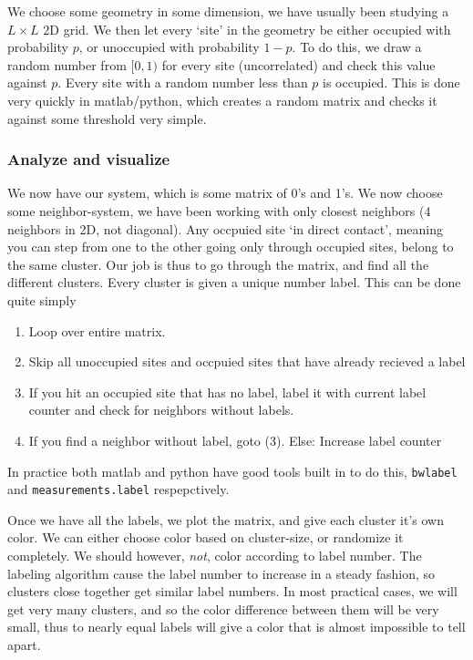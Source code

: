 \documentclass[a4paper, 11pt, notitlepage, english]{article}
\begin{document}
We choose some geometry in some dimension, we have usually been studying a $L\times L$ 2D grid. We then let every `site' in the geometry be either occupied with probability $p$, or unoccupied with probability $1-p$. To do this, we draw a random number from $[0, 1)$ for every site (uncorrelated) and check this value against $p$. Every site with a random number less than $p$ is occupied. This is done very quickly in matlab/python, which creates a random matrix and checks it against some threshold very simple. 

\subsubsection*{Analyze and visualize}

We now have our system, which is some matrix of 0's and 1's. We now choose some neighbor-system, we have been working with only closest neighbors (4 neighbors in 2D, not diagonal). Any occpuied site `in direct contact', meaning you can step from one to the other going only through occupied sites, belong to the same cluster. Our job is thus to go through the matrix, and find all the different clusters. Every cluster is given a unique number label. This can be done quite simply
\begin{enumerate}
	\item Loop over entire matrix. 
	\item Skip all unoccupied sites and occpuied sites that have already recieved a label
	\item If you hit an occupied site that has no label, label it with current label counter and check for neighbors without labels.
	\item If you find a neighbor without label, goto (3). Else: Increase label counter
\end{enumerate}
In practice both matlab and python have good tools built in to do this, \verb+bwlabel+ and \verb+measurements.label+ respepctively.

Once we have all the labels, we plot the matrix, and give each cluster it's own color. We can either choose color based on cluster-size, or randomize it completely. We should however, \emph{not}, color according to label number. The labeling algorithm cause the label number to increase in a steady fashion, so clusters close together get similar label numbers. In most practical cases, we will get very many clusters, and so the color difference between them will be very small, thus to nearly equal labels will give a color that is almost impossible to tell apart.
\end{document}
